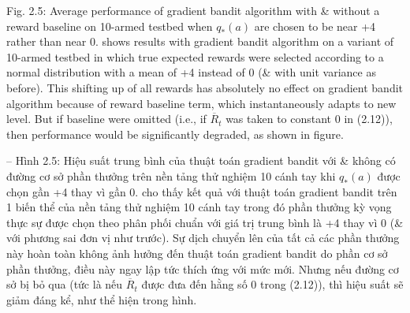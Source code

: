 \documentclass{article}
\begin{document}
\begin{itemize}
\begin{itemize}
        {\sf Fig. 2.5: Average performance of gradient bandit algorithm with \& without a reward baseline on 10-armed testbed when $q_*(a)$ are chosen to be near +4 rather than near 0.} shows results with gradient bandit algorithm on a variant of 10-armed testbed in which true expected rewards were selected according to a normal distribution with a mean of +4 instead of 0 (\& with unit variance as before). This shifting up of all rewards has absolutely no effect on gradient bandit algorithm because of reward baseline term, which instantaneously adapts to new level. But if baseline were omitted (i.e., if $\overline{R}_t$ was taken to constant 0 in (2.12)), then performance would be significantly degraded, as shown in figure.

        -- {\sf Hình 2.5: Hiệu suất trung bình của thuật toán gradient bandit với \& không có đường cơ sở phần thưởng trên nền tảng thử nghiệm 10 cánh tay khi $q_*(a)$ được chọn gần +4 thay vì gần 0.} cho thấy kết quả với thuật toán gradient bandit trên 1 biến thể của nền tảng thử nghiệm 10 cánh tay trong đó phần thưởng kỳ vọng thực sự được chọn theo phân phối chuẩn với giá trị trung bình là +4 thay vì 0 (\& với phương sai đơn vị như trước). Sự dịch chuyển lên của tất cả các phần thưởng này hoàn toàn không ảnh hưởng đến thuật toán gradient bandit do phần cơ sở phần thưởng, điều này ngay lập tức thích ứng với mức mới. Nhưng nếu đường cơ sở bị bỏ qua (tức là nếu $\overline{R}_t$ được đưa đến hằng số 0 trong (2.12)), thì hiệu suất sẽ giảm đáng kể, như thể hiện trong hình.


\end{itemize}
\end{itemize}
\end{document}
